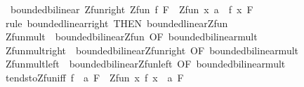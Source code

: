 \begin{isabellebody}
\endisatagproof
{\isafoldproof}%
%
\isadelimproof
\isanewline
%
\endisadelimproof
\isanewline
{}\isamarkupfalse%
\ {\isacharparenleft}{\kern0pt}\ bounded{\isacharunderscore}{\kern0pt}bilinear{\isacharparenright}{\kern0pt}\ Zfun{\isacharunderscore}{\kern0pt}right{\isacharcolon}{\kern0pt}\ {\isachardoublequoteopen}Zfun\ f\ F\ {\isasymLongrightarrow}\ Zfun\ {\isacharparenleft}{\kern0pt}{\isasymlambda}x{\isachardot}{\kern0pt}\ a\ {\isacharasterisk}{\kern0pt}{\isacharasterisk}{\kern0pt}\ f\ x{\isacharparenright}{\kern0pt}\ F{\isachardoublequoteclose}\isanewline
%
\isadelimproof
\ \ %
\endisadelimproof
%
\isatagproof
{}\isamarkupfalse%
\ {\isacharparenleft}{\kern0pt}rule\ bounded{\isacharunderscore}{\kern0pt}linear{\isacharunderscore}{\kern0pt}right\ {\isacharbrackleft}{\kern0pt}THEN\ bounded{\isacharunderscore}{\kern0pt}linear{\isachardot}{\kern0pt}Zfun{\isacharbrackright}{\kern0pt}{\isacharparenright}{\kern0pt}%
\endisatagproof
{\isafoldproof}%
%
\isadelimproof
\isanewline
%
\endisadelimproof
\isanewline
{}\isamarkupfalse%
\ Zfun{\isacharunderscore}{\kern0pt}mult\ {\isacharequal}{\kern0pt}\ bounded{\isacharunderscore}{\kern0pt}bilinear{\isachardot}{\kern0pt}Zfun\ {\isacharbrackleft}{\kern0pt}OF\ bounded{\isacharunderscore}{\kern0pt}bilinear{\isacharunderscore}{\kern0pt}mult{\isacharbrackright}{\kern0pt}\isanewline
{}\isamarkupfalse%
\ Zfun{\isacharunderscore}{\kern0pt}mult{\isacharunderscore}{\kern0pt}right\ {\isacharequal}{\kern0pt}\ bounded{\isacharunderscore}{\kern0pt}bilinear{\isachardot}{\kern0pt}Zfun{\isacharunderscore}{\kern0pt}right\ {\isacharbrackleft}{\kern0pt}OF\ bounded{\isacharunderscore}{\kern0pt}bilinear{\isacharunderscore}{\kern0pt}mult{\isacharbrackright}{\kern0pt}\isanewline
{}\isamarkupfalse%
\ Zfun{\isacharunderscore}{\kern0pt}mult{\isacharunderscore}{\kern0pt}left\ {\isacharequal}{\kern0pt}\ bounded{\isacharunderscore}{\kern0pt}bilinear{\isachardot}{\kern0pt}Zfun{\isacharunderscore}{\kern0pt}left\ {\isacharbrackleft}{\kern0pt}OF\ bounded{\isacharunderscore}{\kern0pt}bilinear{\isacharunderscore}{\kern0pt}mult{\isacharbrackright}{\kern0pt}\isanewline
\isanewline
{}\isamarkupfalse%
\ tendsto{\isacharunderscore}{\kern0pt}Zfun{\isacharunderscore}{\kern0pt}iff{\isacharcolon}{\kern0pt}\ {\isachardoublequoteopen}{\isacharparenleft}{\kern0pt}f\ {\isasymlonglongrightarrow}\ a{\isacharparenright}{\kern0pt}\ F\ {\isacharequal}{\kern0pt}\ Zfun\ {\isacharparenleft}{\kern0pt}{\isasymlambda}x{\isachardot}{\kern0pt}\ f\ x\ {\isacharminus}{\kern0pt}\ a{\isacharparenright}{\kern0pt}\ F{\isachardoublequoteclose}\isanewline

\end{isabellebody}
